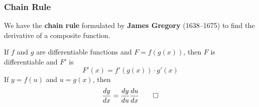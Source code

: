 \subsubsection{Chain Rule}
We have the \textbf{chain rule} formulated by \textbf{James Gregory} (1638--1675) to find the
derivative of a composite function.
\begin{theorem}
    If \(f\) and \(g\) are differentiable functions and \(F=f(g(x))\),
    then \(F\) is differentiable and \(F'\) is
    \[F'(x)=f'(g(x))\cdot g'(x)\]
    If \(y=f(u)\) and \(u=g(x)\), then \[\frac{dy}{dx}=\frac{dy}{du}\frac{du}{dx}\qedhere\]
\end{theorem}